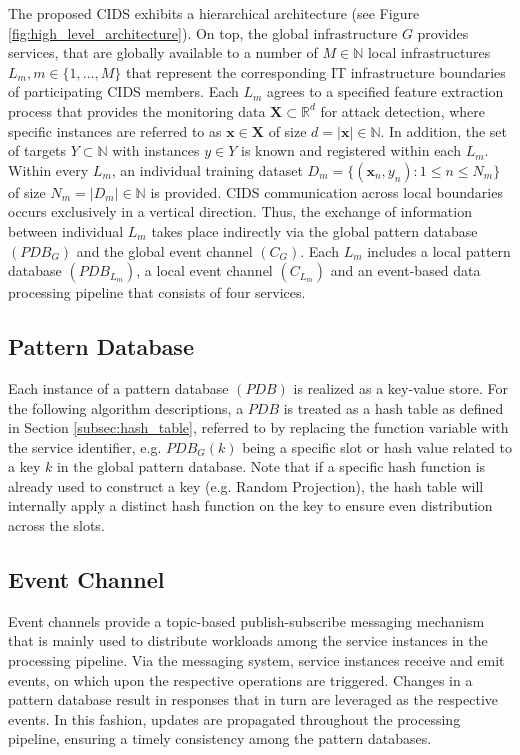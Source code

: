 The proposed CIDS exhibits a hierarchical architecture (see Figure \ref{fig:high_level_architecture}). On top, the global infrastructure $G$ provides services, that are globally available to a number of $M \in \mathbb{N}$ local infrastructures $L_m, m \in \{1, \dots, M\}$ that represent the corresponding IT infrastructure boundaries of participating CIDS members. Each $L_m$ agrees to a specified feature extraction process that provides the monitoring data $\bm{X} \subset \mathbb{R}^d$ for attack detection, where specific instances are referred to as $\bm{x} \in \bm{X}$ of size $d = |\bm{x}| \in \mathbb{N}$. In addition, the set of targets $Y \subset \mathbb{N}$ with instances $y \in Y$ is known and registered within each $L_m$. Within every $L_m$, an individual training dataset $D_m= \{(\bm{x}_n, y_n): 1 \leq n \leq N_m\}$ of size $N_m = |D_m| \in \mathbb{N}$ is provided. CIDS communication across local boundaries occurs exclusively in a vertical direction. Thus, the exchange of information between individual $L_m$ takes place indirectly via the global pattern database $(PDB_G)$ and the global event channel $(C_G)$. Each $L_m$ includes a local pattern database $(PDB_{L_m})$, a local event channel $(C_{L_m})$ and an event-based data processing pipeline that consists of four services.



\subsection{Pattern Database} \label{subsec:pattern_database}
Each instance of a pattern database $(PDB)$ is realized as a key-value store. For the following algorithm descriptions, a $PDB$ is treated as a hash table as defined in Section \ref{subsec:hash_table}, referred to by replacing the function variable with the service identifier, e.g. $PDB_G(k)$ being a specific slot or hash value related to a key $k$ in the global pattern database. Note that if a specific hash function is already used to construct a key (e.g. Random Projection), the hash table will internally apply a distinct hash function on the key to ensure even distribution across the slots. 

\subsection{Event Channel} \label{subsec:event_channel}
Event channels provide a topic-based publish-subscribe messaging mechanism that is mainly used to distribute workloads among the service instances in the processing pipeline. Via the messaging system, service instances receive and emit events, on which upon the respective operations are triggered. Changes in a pattern database result in responses that in turn are leveraged as the respective events. In this fashion, updates are propagated throughout the processing pipeline, ensuring a timely consistency among the pattern databases.

